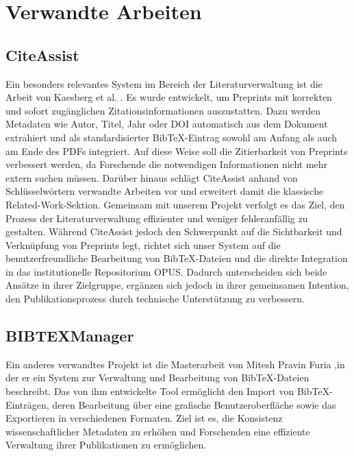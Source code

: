 \chapter{Verwandte Arbeiten}

\section{CiteAssist}
Ein besonders relevantes System im Bereich der Literaturverwaltung ist die Arbeit von  
Kaesberg et al. \cite{kaesberg2024citeassist}. 
Es wurde entwickelt, um Preprints mit korrekten und sofort 
zugänglichen Zitationsinformationen auszustatten. Dazu werden 
Metadaten wie Autor, Titel, Jahr oder DOI automatisch aus dem 
Dokument extrahiert und als standardisierter BibTeX-Eintrag 
sowohl am Anfang als auch am Ende des PDFs integriert. Auf 
diese Weise soll die Zitierbarkeit von Preprints verbessert 
werden, da Forschende die notwendigen Informationen nicht 
mehr extern suchen müssen. Darüber hinaus schlägt CiteAssist 
anhand von Schlüsselwörtern verwandte Arbeiten vor und 
erweitert damit die klassische Related-Work-Sektion. 
Gemeinsam mit unserem Projekt verfolgt es das Ziel, 
den Prozess der Literaturverwaltung effizienter und 
weniger fehleranfällig zu gestalten. Während CiteAssist 
jedoch den Schwerpunkt auf die Sichtbarkeit und Verknüpfung 
von Preprints legt, richtet sich unser System auf die 
benutzerfreundliche Bearbeitung von BibTeX-Dateien und 
die direkte Integration in das institutionelle Repositorium 
OPUS. Dadurch unterscheiden sich beide Ansätze in ihrer 
Zielgruppe, ergänzen sich jedoch in ihrer gemeinsamen Intention, 
den Publikationsprozess durch technische Unterstützung zu verbessern.

\section{BIBTEXManager}

Ein anderes  verwandtes Projekt ist die Masterarbeit von Mitesh Pravin Furia \cite{furia2009},in der er  ein 
System zur Verwaltung und Bearbeitung von Bib\TeX{}-Dateien beschreibt. 
Das von ihm  entwickelte Tool ermöglicht den Import von Bib\TeX{}-Einträgen, 
deren Bearbeitung über eine grafische Benutzeroberfläche sowie das Exportieren 
in verschiedenen Formaten. Ziel ist es, die Konsistenz wissenschaftlicher 
Metadaten zu erhöhen und Forschenden eine effiziente Verwaltung ihrer 
Publikationen zu ermöglichen.\\

